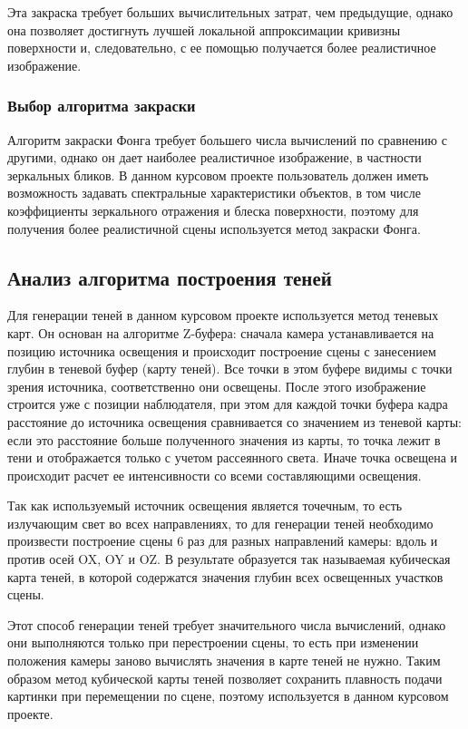 Эта закраска требует больших вычислительных затрат, чем предыдущие, однако она позволяет достигнуть лучшей локальной аппроксимации кривизны поверхности и, следовательно, с ее помощью получается более реалистичное изображение. 

\subsubsection {Выбор алгоритма закраски}

Алгоритм закраски Фонга требует большего числа вычислений по сравнению с другими, однако он дает наиболее реалистичное изображение, в частности зеркальных бликов. В данном курсовом проекте пользователь должен иметь возможность задавать спектральные характеристики объектов, в том числе коэффициенты зеркального отражения и блеска поверхности, поэтому для получения более реалистичной сцены используется метод закраски Фонга.

\subsection{Анализ алгоритма построения теней}

Для генерации теней в данном курсовом проекте используется метод теневых карт. 
Он основан на алгоритме Z-буфера: сначала камера устанавливается на позицию источника освещения и происходит построение сцены с занесением глубин в теневой буфер (карту теней). 
Все точки в этом буфере видимы с точки зрения источника, соответственно они освещены. 
После этого изображение строится уже с позиции наблюдателя, при этом для каждой точки буфера кадра расстояние до источника освещения сравнивается со значением из теневой карты: если это расстояние больше полученного значения из карты, то точка лежит в тени и отображается только с учетом рассеянного света. Иначе точка освещена и происходит расчет ее интенсивности со всеми составляющими освещения. 

Так как используемый источник освещения является точечным, то есть излучающим свет во всех направлениях, то для генерации теней необходимо произвести построение сцены 6 раз для разных направлений камеры: вдоль и против осей OX, OY и OZ. В результате образуется так называемая кубическая карта теней, в которой содержатся значения глубин всех освещенных участков сцены. 

Этот способ генерации теней требует значительного числа вычислений, однако они выполняются только при перестроении сцены, то есть при изменении положения камеры заново вычислять значения в карте теней не нужно. Таким образом метод кубической карты теней позволяет сохранить плавность подачи картинки при перемещении по сцене, поэтому используется в данном курсовом проекте.

